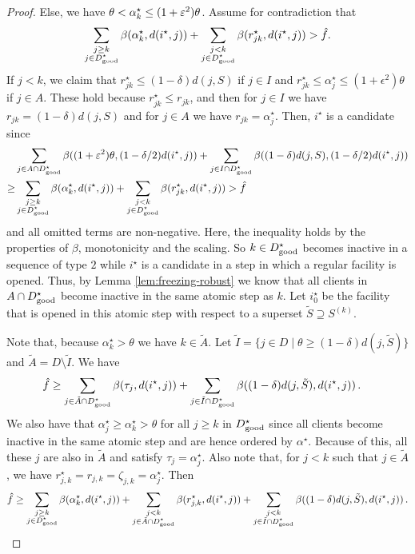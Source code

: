 \begin{proof}
    Else, we have $\theta < \alpha_k^\star \leq (1+\varepsilon^2) \theta$. Assume for contradiction that
    \[
        \sum_{\substack{j \ge k\\ j \in D^\star_{\mathrm{good}}}} \beta(\alpha^\star_k, d(i^\star,j)) + \sum_{\substack{j < k\\ j \in D^\star_{\mathrm{good}}}} \beta(r^\star_{jk}, d(i^\star,j)) >  \hat f.
    \]
    If $j < k$, we claim that $r^\star_{jk} \leq (1-\delta)d(j,S)$ if $j \in I$ and $r^\star_{jk} \leq \alpha^\star_j \leq (1+\epsilon^2)\theta$ if $j \in A$.
    These hold because $r^\star_{jk} \leq r_{jk}$, and then for $j \in I$ we have $r_{jk} = (1-\delta) d(j,S)$ and for $j \in A$ we have $r_{jk} = \alpha_j^\star$.
    Then, $i^\star$ is a candidate since
    \begin{align*}
        & \sum_{j\in A\cap D^\star_{\mathrm{good}}}\beta((1+\varepsilon^2)\theta, (1- \delta/2)d(i^\star,j)) + \sum_{j\in I\cap D^\star_{\mathrm{good}}}\beta((1-\delta)d(j,S), (1-\delta/2)d(i^\star,j)) \\
        \ge & \sum_{\substack{j \ge k\\ j \in D^\star_{\mathrm{good}}}} \beta(\alpha^\star_k, d(i^\star,j)) + \sum_{\substack{j < k\\ j \in D^\star_{\mathrm{good}}}} \beta(r^\star_{jk}, d(i^\star,j)) > \hat f
    \end{align*}
    and all omitted terms are non-negative.
    Here, the inequality holds by the properties of $\beta$, monotonicity and the scaling.
    So $k \in D^\star_{\mathrm{good}}$ becomes inactive in a sequence of type $2$ while $i^\star$ is a candidate in a step in which a regular facility is opened. Thus, by Lemma \ref{lem:freezing-robust} we know that all clients in $A \cap D^\star_{\mathrm{good}}$ become inactive in the same atomic step as $k$.
    Let $i^\star_0$ be the facility that is opened in this atomic step with respect to a superset $\tilde{S} \supseteq S^{(k)}$.

    Note that, because $\alpha_k^\star > \theta$ we have $k \in \tilde{A}$.
    Let $\tilde{I} = \{j \in D \mid \theta \geq (1-\delta)d(j,\tilde S)\}$ and $\tilde{A} = D \setminus \tilde{I}$.
    We have
    \begin{align*}
    \hat f &\ge \sum_{j \in \tilde A\cap D^\star_{\mathrm{good}}} \beta(\tau_j, d(i^\star,j)) + \sum_{j \in \tilde  I\cap D^\star_{\mathrm{good}}} \beta((1-\delta)d(j, \tilde  S), d(i^\star,j))\,.
    \end{align*}
    We also have that $\alpha_j^\star \geq \alpha_k^\star > \theta$ for all $j \geq k$ in $D^\star_{\mathrm{good}}$ since all clients become inactive in the same atomic step and are hence ordered by $\alpha^\star$. Because of this, all these $j$ are also in $\tilde A$ and satisfy $\tau_j = \alpha_j^\star$.
    Also note that, for $j < k$ such that $j \in \tilde A$, we have $r^\star_{j,k} = r_{j,k} = \zeta_{j,k} = \alpha_j^\star$.
    Then
    \[\hat f \geq \sum_{\substack{j \ge k\\ j \in D^\star_{\mathrm{good}}}} \beta(\alpha^\star_k, d(i^\star,j)) + \sum_{\substack{j < k\\ j \in \tilde A \cap D^\star_{\mathrm{good}}}} \beta(r^\star_{j,k}, d(i^\star,j)) + \sum_{\substack{j < k\\ j \in \tilde I \cap D^\star_{\mathrm{good}}}} \beta((1-\delta)d(j, \tilde S), d(i^\star,j))\,.\]


\end{proof}
